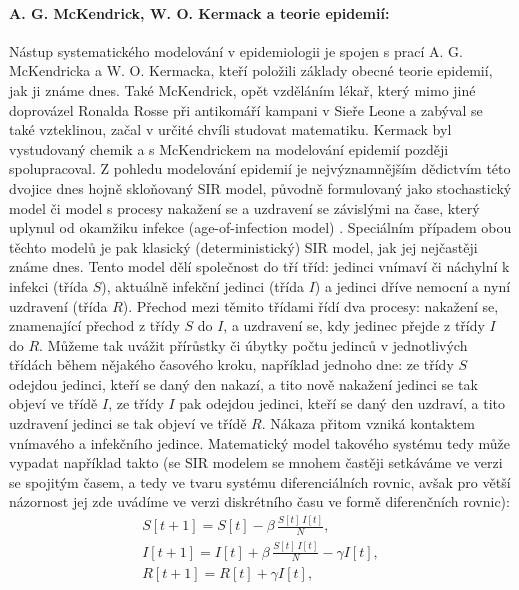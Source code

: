 
\paragraph{A. G. McKendrick, W. O. Kermack a teorie epidemií:} Nástup systematického modelování v epidemiologii je spojen s prací A. G. McKendricka a W. O. Kermacka, kteří položili základy obecné teorie epidemií, jak ji známe dnes. Také McKendrick, opět vzděláním lékař, který mimo jiné doprovázel Ronalda Rosse při antikomáří kampani v Sieře Leone a zabýval se také vzteklinou, začal v určité chvíli studovat matematiku. Kermack byl vystudovaný chemik a s McKendrickem na modelování epidemií později spolupracoval. Z pohledu modelování epidemií je nejvýznamnějším dědictvím této dvojice dnes hojně skloňovaný SIR model, původně formulovaný jako stochastický model \cite{McKendrick1925} či model s procesy nakažení se a uzdravení se závislými na čase, který uplynul od okamžiku infekce (age-of-infection model) \cite{McKendrickKermack1927,YangBrauer2008}. Speciálním případem obou těchto modelů je pak klasický (deterministický) SIR model, jak jej nejčastěji známe dnes. Tento model dělí společnost do tří tříd: jedinci vnímaví či náchylní k infekci (třída $S$), aktuálně infekční jedinci (třída $I$) a jedinci dříve nemocní a nyní uzdravení (třída $R$). Přechod mezi těmito třídami řídí dva procesy: nakažení se, znamenající přechod z třídy $S$ do $I$, a uzdravení se, kdy jedinec přejde z třídy $I$ do $R$. Můžeme tak uvážit přírůstky či úbytky počtu jedinců v jednotlivých třídách během nějakého časového kroku, například jednoho dne: ze třídy $S$ odejdou jedinci, kteří se daný den nakazí, a tito nově nakažení jedinci se tak objeví ve třídě $I$, ze třídy $I$ pak odejdou jedinci, kteří se daný den uzdraví, a tito uzdravení jedinci se tak objeví ve třídě $R$. Nákaza přitom vzniká kontaktem vnímavého a infekčního jedince. Matematický model takového systému tedy může vypadat například takto (se SIR modelem se mnohem častěji setkáváme ve verzi se spojitým časem, a tedy ve tvaru systému diferenciálních rovnic, avšak pro větší názornost jej zde uvádíme ve verzi diskrétního času ve formě diferenčních rovnic):
\begin{equation}
\begin{array}{l}
\displaystyle{S[t+1] = S[t] - \beta \, \frac{S[t]\,I[t]}{N}}, \\[3ex]
\displaystyle{I[t+1] = I[t] + \beta \, \frac{S[t]\,I[t]}{N} - \gamma I[t]}, \\[3ex]
\displaystyle{R[t+1] = R[t] + \gamma I[t]},
\end{array}
\label{SIR1}
\end{equation}
